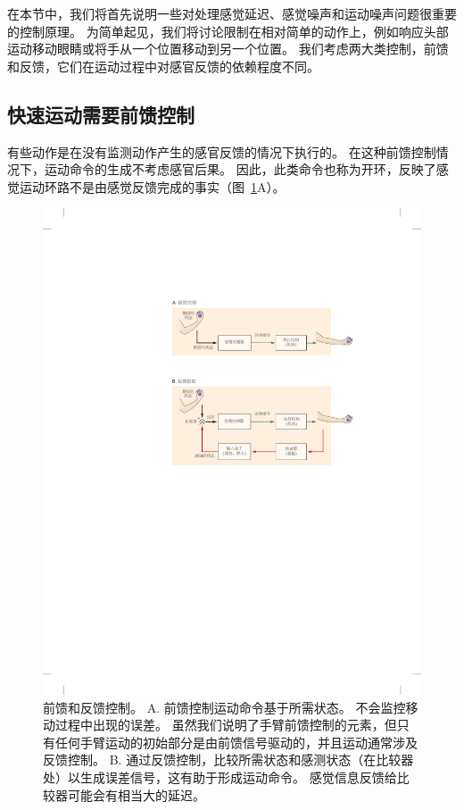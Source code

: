 在本节中，我们将首先说明一些对处理感觉延迟、感觉噪声和运动噪声问题很重要的控制原理。
为简单起见，我们将讨论限制在相对简单的动作上，例如响应头部运动移动眼睛或将手从一个位置移动到另一个位置。
我们考虑两大类控制，前馈和反馈，它们在运动过程中对感官反馈的依赖程度不同。



\subsection{快速运动需要前馈控制}

有些动作是在没有监测动作产生的感官反馈的情况下执行的。
在这种前馈控制情况下，运动命令的生成不考虑感官后果。
因此，此类命令也称为开环，反映了感觉运动环路不是由感觉反馈完成的事实（图~\ref{fig:30_2}A）。


\begin{figure}[htbp]
	\centering
	\includegraphics[width=1.0\linewidth]{chap30/fig_30_2}
	\caption{前馈和反馈控制。
		A. 前馈控制运动命令基于所需状态。
		不会监控移动过程中出现的误差。
		虽然我们说明了手臂前馈控制的元素，但只有任何手臂运动的初始部分是由前馈信号驱动的，并且运动通常涉及反馈控制。
		B. 通过反馈控制，比较所需状态和感测状态（在比较器处）以生成误差信号，这有助于形成运动命令。
		感觉信息反馈给比较器可能会有相当大的延迟。}
	\label{fig:30_2}
\end{figure}


